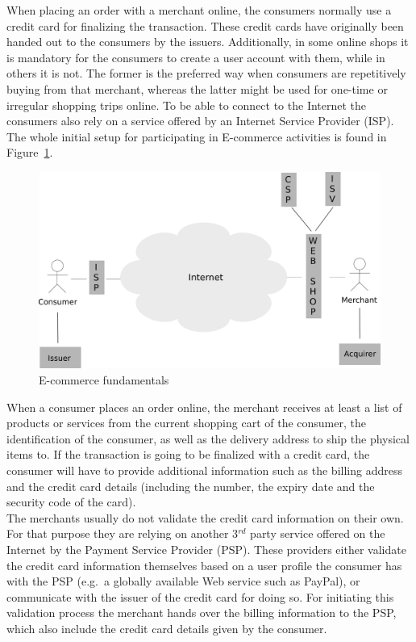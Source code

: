 When placing an order with a merchant online, the consumers normally use a credit card for finalizing the transaction. These credit cards have originally been handed out to the consumers by the issuers. Additionally, in some online shops it is mandatory for the consumers to create a user account with them, while in others it is not. The former is the preferred way when consumers are repetitively buying from that merchant, whereas the latter might be used for one-time or irregular shopping trips online. To be able to connect to the Internet the consumers also rely on a service offered by an Internet Service Provider (\gls{ISP}). The whole initial setup for participating in \gls{E-commerce} activities is found in Figure~\ref{fig:images_ecommerce_scenario}.\@

\begin{figure}[H]
	\centering
		\includegraphics[width=0.9\columnwidth]{images/e-commerce-scenario.pdf}
	\caption{\Gls{E-commerce} fundamentals}
\label{fig:images_ecommerce_scenario}
\end{figure}

When a consumer places an order online, the merchant receives at least a list of products or services from the current shopping cart of the consumer, the identification of the consumer, as well as the delivery address to ship the physical items to. If the transaction is going to be finalized with a credit card, the consumer will have to provide additional information such as the billing address and the credit card details (including the number, the expiry date and the security code of the card). \\

The merchants usually do not validate the credit card information on their own. For that purpose they are relying on another 3$^{rd}$ party service offered on the Internet by the Payment Service Provider (\gls{PSP}). These providers either validate the credit card information themselves based on a user profile the consumer has with the \gls{PSP} (e.g.\ a globally available Web service such as PayPal), or communicate with the issuer of the credit card for doing so. For initiating this validation process the merchant hands over the billing information to the \gls{PSP}, which also include the credit card details given by the consumer. \\

